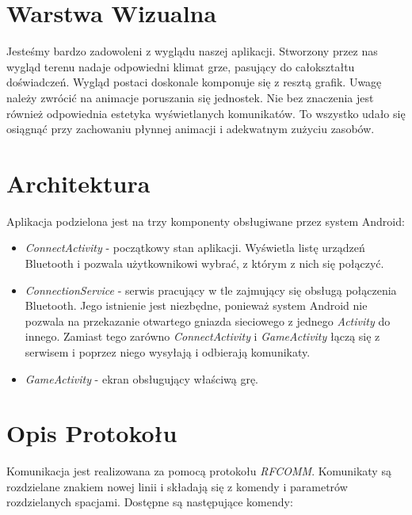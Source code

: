 \documentclass[paper=a4, fontsize=11pt]{scrartcl} %
\numberwithin{equation}{section} %
\numberwithin{figure}{section} %
\numberwithin{table}{section} %
\begin{document}
\section{Warstwa Wizualna}
Jesteśmy bardzo zadowoleni z wyglądu naszej aplikacji. Stworzony przez nas wygląd terenu nadaje odpowiedni klimat grze, pasujący do całokształtu doświadczeń. Wygląd postaci doskonale komponuje się z resztą grafik. Uwagę należy zwrócić na animacje poruszania się jednostek. Nie bez znaczenia jest również odpowiednia estetyka wyświetlanych komunikatów. To wszystko udało się osiągnąć przy zachowaniu płynnej animacji i adekwatnym zużyciu zasobów.

\section{Architektura}
Aplikacja podzielona jest na trzy komponenty obsługiwane przez system Android:

\begin{itemize}

  \item \emph{ConnectActivity} - początkowy stan aplikacji. Wyświetla listę
    urządzeń Bluetooth i pozwala użytkownikowi wybrać, z którym z nich się
    połączyć.

  \item \emph{ConnectionService} - serwis pracujący w tle zajmujący się obsługą
    połączenia Bluetooth. Jego istnienie jest niezbędne, ponieważ system
    Android nie pozwala na przekazanie otwartego gniazda sieciowego z jednego
    \textit{Activity} do innego. Zamiast tego zarówno \textit{ConnectActivity}
    i \textit{GameActivity} łączą się z serwisem i poprzez niego wysyłają i
    odbierają komunikaty.

  \item \emph{GameActivity} - ekran obsługujący właściwą grę.

\end{itemize}

\section{Opis Protokołu}

Komunikacja jest realizowana za pomocą protokołu \textit{RFCOMM}.
Komunikaty są rozdzielane znakiem nowej linii i składają się z komendy i parametrów rozdzielanych spacjami.
Dostępne są następujące komendy:
\end{document}
